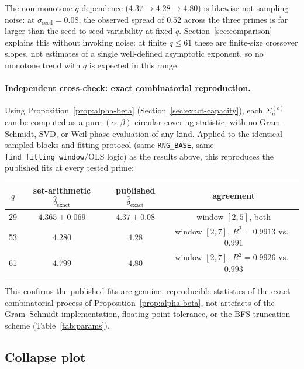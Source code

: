     The non-monotone $q$-dependence ($4.37 \to 4.28 \to 4.80$) is likewise not sampling
    noise: at $\sigma_{\mathrm{seed}}=0.08$, the observed spread of $0.52$ across the three
    primes is far larger than the seed-to-seed variability at fixed $q$.
    Section~\ref{sec:comparison} explains this without invoking noise: at finite $q\leq 61$
    these are finite-size crossover slopes, not estimates of a single well-defined asymptotic
    exponent, so no monotone trend with $q$ is expected in this range.

    \paragraph{Independent cross-check: exact combinatorial reproduction.}
      Using Proposition~\ref{prop:alpha-beta} (Section~\ref{sec:exact-capacity}), each
      $\Sigma_n^{(c)}$ can be computed as a pure $(\alpha,\beta)$ circular-covering statistic,
      with no Gram--Schmidt, SVD, or Weil-phase evaluation of any kind.
      Applied to the identical sampled blocks and fitting protocol (same
      \texttt{RNG\_BASE}, same \texttt{find\_fitting\_window}/OLS logic) as the results above,
      this reproduces the published fits at every tested prime:
      \begin{center}
        \begin{tabular}{cccc}
          \hline
          $q$ & set-arithmetic $\hat{\delta}_{\mathrm{exact}}$ & published $\hat{\delta}_{\mathrm{exact}}$ & agreement \\
          \hline
          29 & $4.365\pm0.069$ & $4.37\pm0.08$ & window $[2,5]$, both \\
          53 & $4.280$         & $4.28$        & window $[2,7]$, $R^2=0.9913$ vs.\ $0.991$ \\
          61 & $4.799$         & $4.80$        & window $[2,7]$, $R^2=0.9926$ vs.\ $0.993$ \\
          \hline
        \end{tabular}
      \end{center}
      This confirms the published fits are genuine, reproducible statistics of the exact
      combinatorial process of Proposition~\ref{prop:alpha-beta}, not artefacts of the
      Gram--Schmidt implementation, floating-point tolerance, or the BFS truncation scheme
      (Table~\ref{tab:params}).

  \subsection{Collapse plot}
    \label{sec:collapse}


